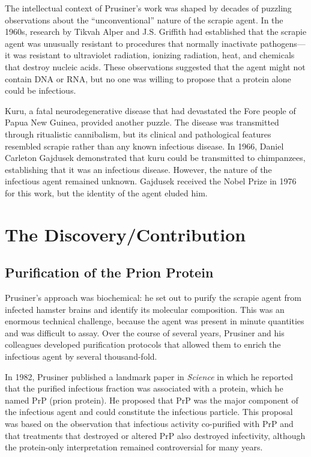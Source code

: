The intellectual context of Prusiner's work was shaped by decades of puzzling observations about the ``unconventional'' nature of the scrapie agent. In the 1960s, research by Tikvah Alper and J.S. Griffith had established that the scrapie agent was unusually resistant to procedures that normally inactivate pathogens---it was resistant to ultraviolet radiation, ionizing radiation, heat, and chemicals that destroy nucleic acids. These observations suggested that the agent might not contain DNA or RNA, but no one was willing to propose that a protein alone could be infectious.

Kuru, a fatal neurodegenerative disease that had devastated the Fore people of Papua New Guinea, provided another puzzle. The disease was transmitted through ritualistic cannibalism, but its clinical and pathological features resembled scrapie rather than any known infectious disease. In 1966, Daniel Carleton Gajdusek demonstrated that kuru could be transmitted to chimpanzees, establishing that it was an infectious disease. However, the nature of the infectious agent remained unknown. Gajdusek received the Nobel Prize in 1976 for this work, but the identity of the agent eluded him.

\section{The Discovery/Contribution}

\subsection{Purification of the Prion Protein}

Prusiner's approach was biochemical: he set out to purify the scrapie agent from infected hamster brains and identify its molecular composition. This was an enormous technical challenge, because the agent was present in minute quantities and was difficult to assay. Over the course of several years, Prusiner and his colleagues developed purification protocols that allowed them to enrich the infectious agent by several thousand-fold.

In 1982, Prusiner published a landmark paper in \textit{Science} in which he reported that the purified infectious fraction was associated with a protein, which he named PrP (prion protein). He proposed that PrP was the major component of the infectious agent and could constitute the infectious particle. This proposal was based on the observation that infectious activity co-purified with PrP and that treatments that destroyed or altered PrP also destroyed infectivity, although the protein-only interpretation remained controversial for many years.

